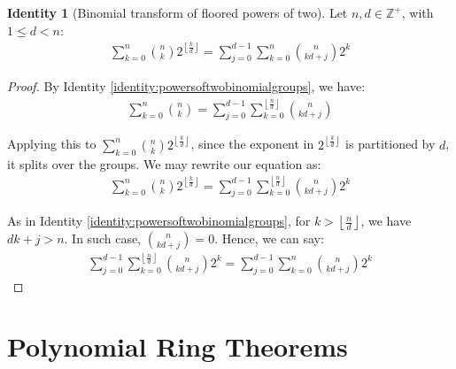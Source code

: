 \documentclass{article}
\theoremstyle{plain}
\theoremstyle{definition}
\newtheorem{identity}{Identity}
\newcommand{\floor}[1]{\left\lfloor #1 \right\rfloor}
\newcommand{\Z}{\mathbb{Z}}
\begin{document}
\begin{identity}[Binomial transform of floored powers of two] \label{identity:flooredpowersoftwobinomialgroups}
Let $n, d \in \Z^+$, with $1 \leq d < n$:
\begin{align}
    \sum_{k=0}^{n} \binom{n}{k} 2^{\floor{\frac{k}{d}}} = \sum_{j=0}^{d-1} \sum_{k=0}^{n} \binom{n}{kd + j} 2^{k}
\end{align}
\end{identity}
\begin{proof}
    By Identity \ref{identity:powersoftwobinomialgroups}, we have:
    \begin{align}
        \sum_{k=0}^{n} \binom{n}{k} = \sum_{j=0}^{d-1} \sum_{k=0}^{\floor{\frac{n}{d}}} \binom{n}{kd + j}
    \end{align}

    Applying this to $\sum_{k=0}^{n} \binom{n}{k} 2^{\floor{\frac{k}{d}}}$, since the exponent in $2^{\floor{\frac{k}{d}}}$ is partitioned by $d$, it splits over the groups. We may rewrite our equation as:
    \begin{align}
        \sum_{k=0}^{n} \binom{n}{k} 2^{\floor{\frac{k}{d}}} = \sum_{j=0}^{d-1} \sum_{k=0}^{\floor{\frac{n}{d}}} \binom{n}{kd + j} 2^{k}
    \end{align}

    As in Identity \ref{identity:powersoftwobinomialgroups}, for $k > \floor{\frac{n}{d}}$, we have $d k + j > n$. In such case, $\binom{n}{kd + j} = 0$. Hence, we can say:
    \begin{align}
        \sum_{j=0}^{d-1} \sum_{k=0}^{\floor{\frac{n}{d}}} \binom{n}{kd + j} 2^{k} = \sum_{j=0}^{d-1} \sum_{k=0}^{n} \binom{n}{kd + j} 2^{k}
    \end{align}
\end{proof}

\section{Polynomial Ring Theorems}
\end{document}
